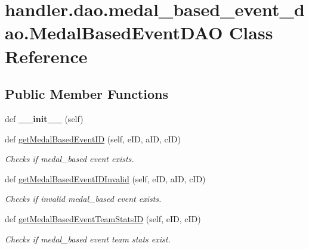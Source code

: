 \hypertarget{classhandler_1_1dao_1_1medal__based__event__dao_1_1_medal_based_event_d_a_o}{}\section{handler.\+dao.\+medal\+\_\+based\+\_\+event\+\_\+dao.\+Medal\+Based\+Event\+D\+AO Class Reference}
\label{classhandler_1_1dao_1_1medal__based__event__dao_1_1_medal_based_event_d_a_o}
\subsection*{Public Member Functions}
\begin{DoxyCompactItemize}
\item 
\mbox{\label{classhandler_1_1dao_1_1medal__based__event__dao_1_1_medal_based_event_d_a_o_ad679506db76fc3d4153627735e966575}} 
def {\bfseries \+\_\+\+\_\+init\+\_\+\+\_\+} (self)
\item 
def \hyperlink{classhandler_1_1dao_1_1medal__based__event__dao_1_1_medal_based_event_d_a_o_a240c56a60f4653add9314264fa1013b0}{get\+Medal\+Based\+Event\+ID} (self, e\+ID, a\+ID, c\+ID)
\begin{DoxyCompactList}\small\item\em Checks if medal\+\_\+based event exists. \end{DoxyCompactList}\item 
def \hyperlink{classhandler_1_1dao_1_1medal__based__event__dao_1_1_medal_based_event_d_a_o_a25da92f9caa3c001db0cc9517a666cf9}{get\+Medal\+Based\+Event\+I\+D\+Invalid} (self, e\+ID, a\+ID, c\+ID)
\begin{DoxyCompactList}\small\item\em Checks if invalid medal\+\_\+based event exists. \end{DoxyCompactList}\item 
def \hyperlink{classhandler_1_1dao_1_1medal__based__event__dao_1_1_medal_based_event_d_a_o_a846c2e53b2086fc1adb358baa64b62a2}{get\+Medal\+Based\+Event\+Team\+Stats\+ID} (self, e\+ID, c\+ID)
\begin{DoxyCompactList}\small\item\em Checks if medal\+\_\+based event team stats exist. \end{DoxyCompactList}\item 

\end{DoxyCompactItemize}
